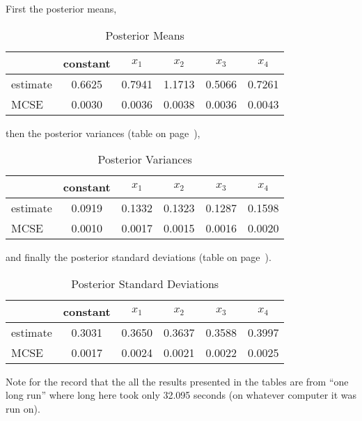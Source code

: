 \documentclass{article}
\begin{document}
First the posterior means,
\begin{table}[ht]
\caption{Posterior Means}
\label{tab:mu}
\begin{center}
\begin{tabular}{lccccc}
  \hline
 & constant & $x_1$ & $x_2$ & $x_3$ & $x_4$ \\ 
  \hline
estimate & 0.6625 & 0.7941 & 1.1713 & 0.5066 & 0.7261 \\ 
  MCSE & 0.0030 & 0.0036 & 0.0038 & 0.0036 & 0.0043 \\ 
   \hline
\end{tabular}\end{center}
\end{table}
then the posterior variances (table on page~\pageref{tab:sigmasq}),
\begin{table}[ht]
\caption{Posterior Variances}
\label{tab:sigmasq}
\begin{center}
\begin{tabular}{lccccc}
  \hline
 & constant & $x_1$ & $x_2$ & $x_3$ & $x_4$ \\ 
  \hline
estimate & 0.0919 & 0.1332 & 0.1323 & 0.1287 & 0.1598 \\ 
  MCSE & 0.0010 & 0.0017 & 0.0015 & 0.0016 & 0.0020 \\ 
   \hline
\end{tabular}\end{center}
\end{table}
and finally the posterior standard deviations
(table on page~\pageref{tab:sigma}).
\begin{table}[ht]
\caption{Posterior Standard Deviations}
\label{tab:sigma}
\begin{center}
\begin{tabular}{lccccc}
  \hline
 & constant & $x_1$ & $x_2$ & $x_3$ & $x_4$ \\ 
  \hline
estimate & 0.3031 & 0.3650 & 0.3637 & 0.3588 & 0.3997 \\ 
  MCSE & 0.0017 & 0.0024 & 0.0021 & 0.0022 & 0.0025 \\ 
   \hline
\end{tabular}\end{center}
\end{table}

Note for the record that the all the results presented in the tables
are from ``one long run'' where long here took only
32.095 seconds (on whatever computer it was run on).
\end{document}

